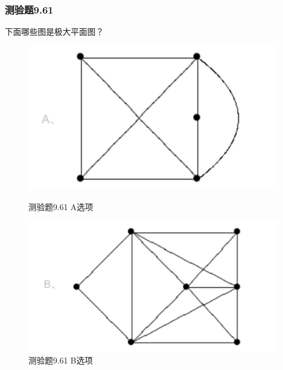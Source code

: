 \documentclass[UTF8, heading=true]{ctexart}
\begin{document}
\subsubsection{测验题9.61}

下面哪些图是极大平面图？

\begin{figure}[H]
    \centering
    \begin{minipage}[t]{0.35\textwidth}
        \centering
        \includegraphics[width=1\textwidth]{9.61_1.jpg} %
	      \vspace{-0.3cm}
        \caption{测验题9.61 A选项}
    \end{minipage}
	  \hspace{0.1\textwidth} %
    \begin{minipage}[t]{0.35\textwidth}
        \centering
        \includegraphics[width=1\textwidth]{9.61_2.jpg} %
	      \vspace{-0.3cm}
        \caption{测验题9.61 B选项}
\end{minipage}
\end{figure}
\end{document}
